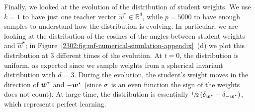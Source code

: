Finally, we looked at the evolution of the distribution of student weights. We use $k=1$ to have just one teacher vector $\vec{w}^{\star}\in\mathbb{R}^{d}$, while \(p=5000\) to have enough samples to understand how the distribution is evolving. In particular, we are looking at the distribution of the cosines of the angles between student weights and $\vec{w}^{\star}$; in Figure~\ref{2302:fig:mf-numerical-simulation-appendix}~(d) we plot this distribution at 3 different times of the evolution.
At \(t=0\), the distribution is uniform, as expected since we sample weights from a spherical invariant distribution with \(d=3\). 
During the evolution, the student's weight moves in the direction of ${\boldsymbol{w}}^\star$ and $-{\boldsymbol{w}}^\star$ (since $\sigma$ is an even function the sign of the weights does not count). At large time, the distribution is essentially $\sfrac12\left(\delta_{{\boldsymbol{w}}^\star} + \delta_{-{\boldsymbol{w}}^\star}\right)$, which represents perfect learning.
